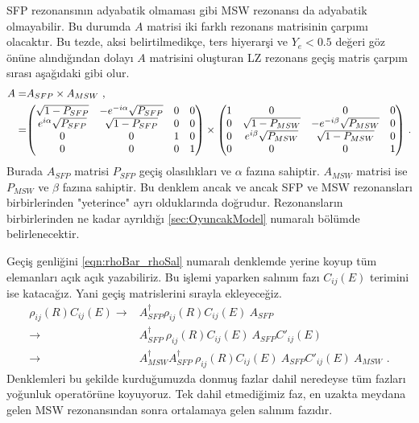 SFP rezonansının adyabatik olmaması gibi MSW rezonansı da adyabatik olmayabilir. Bu durumda $ A $ matrisi iki farklı rezonans matrisinin çarpımı olacaktır. Bu tezde, aksi belirtilmedikçe, ters hiyerarşi ve $ Y_{e}<0.5 $ değeri göz önüne alındığından dolayı $ A $ matrisini oluşturan LZ rezonans geçiş matris çarpım sırası aşağıdaki gibi olur.
\begin{align}
    \nonumber A =& A_{SFP} \times A_{MSW} \text{ ,}\\
      =& \mqty(\sqrt{1-P_{SFP}} & -e^{-i\alpha}\sqrt{P_{SFP}} & 0 & 0 \\
      e^{i\alpha}\sqrt{P_{SFP}} & \sqrt{1-P_{SFP}} & 0 & 0 \\ 0 & 0 & 1 & 0 \\ 0 & 0 & 0 & 1) \times
      \mqty(1 & 0 & 0 & 0 \\ 0 & \sqrt{1-P_{MSW}} & -e^{-i\beta}\sqrt{P_{MSW}} & 0 \\ 0 & e^{i\beta}\sqrt{P_{MSW}} & \sqrt{1-P_{MSW}} & 0 \\ 0 & 0 & 0 & 1) \text{ .}
\end{align}
Burada $ A_{SFP} $ matrisi $ P_{SFP} $ geçiş olasılıkları ve $ \alpha $ fazına sahiptir. $ A_{MSW} $ matrisi ise $ P_{MSW} $ ve $ \beta $ fazına sahiptir. Bu denklem ancak ve ancak SFP ve MSW rezonansları birbirlerinden "yeterince" ayrı olduklarında doğrudur. Rezonansların birbirlerinden ne kadar ayrıldığı  \ref{sec:OyuncakModel} numaralı bölümde belirlenecektir. 

Geçiş genliğini \eqref{eqn:rhoBar_rhoSal} numaralı denklemde yerine koyup tüm elemanları açık açık yazabiliriz. Bu işlemi yaparken salınım fazı $ C_{ij}(E) $ terimini ise katacağız. Yani geçiş matrislerini sırayla ekleyeceğiz.
\begin{align}
    \rho_{ij}(R)C_{ij}(E) \rightarrow& A^{\dagger}_{SFP}\rho_{ij}(R)C_{ij}(E)~A_{SFP}\\
    \rightarrow& A^{\dagger}_{SFP} ~ \rho_{ij}(R)C_{ij}(E)~A_{SFP} C'_{ij}(E)\\
    \rightarrow& A^{\dagger}_{MSW}A^{\dagger}_{SFP}~\rho_{ij}(R)C_{ij}(E)~A_{SFP} C'_{ij}(E)~A_{MSW} \text{ .}
\end{align}
Denklemleri bu şekilde kurduğumuzda donmuş fazlar dahil neredeyse tüm fazları yoğunluk operatörüne koyuyoruz. Tek dahil etmediğimiz faz, en uzakta meydana gelen MSW rezonansından sonra ortalamaya gelen salınım fazıdır.

